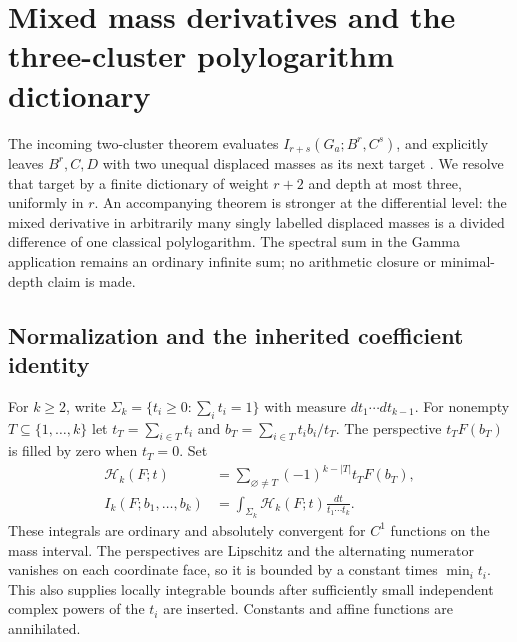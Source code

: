 
\section{Mixed mass derivatives and the three-cluster polylogarithm dictionary}
\label{tri:sec:main}

The incoming two-cluster theorem evaluates
$I_{r+s}(G_a;B^r,C^s)$, and explicitly leaves $B^r,C,D$ with two
unequal displaced masses as its next target \cite{GammaColored}. We resolve that target
by a finite dictionary of weight $r+2$ and depth at most three,
uniformly in $r$. An accompanying theorem is stronger at the
differential level: the mixed derivative in arbitrarily many singly
labelled displaced masses is a divided difference of one classical
polylogarithm. The spectral sum in the Gamma application remains an
ordinary infinite sum; no arithmetic closure or minimal-depth claim
is made.

\subsection{Normalization and the inherited coefficient identity}

For $k\ge2$, write $\Sigma_k=\{t_i\ge0:\sum_i t_i=1\}$ with
measure $dt_1\cdots dt_{k-1}$. For nonempty $T\subseteq\{1,\ldots,k\}$
let $t_T=\sum_{i\in T}t_i$ and
$b_T=\sum_{i\in T}t_i b_i/t_T$. The perspective $t_TF(b_T)$ is
filled by zero when $t_T=0$. Set
\begin{align}
 \mathcal H_k(F;t)&=\sum_{\varnothing\ne T}
                (-1)^{k-|T|}t_TF(b_T),\label{tri:eq:H}\\
 I_k(F;b_1,\ldots,b_k)&=\int_{\Sigma_k}
                   \mathcal H_k(F;t)\frac{dt}{t_1\cdots t_k}.
                   \label{tri:eq:I}
\end{align}
These integrals are ordinary and absolutely convergent for $C^1$
functions on the mass interval. The perspectives are Lipschitz and
the alternating numerator vanishes on each coordinate face, so it
is bounded by a constant times $\min_i t_i$. This also supplies
locally integrable bounds after sufficiently small independent
complex powers of the $t_i$ are inserted. Constants and affine
functions are annihilated.

